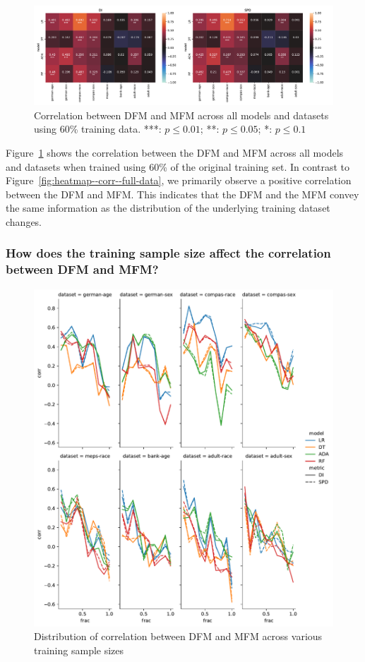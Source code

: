 \documentclass{article}
\begin{document}
\begin{figure}
  \centering
  \includegraphics[width=0.95\linewidth]{heatmap--corr--training-sets-frac.pdf}
  \caption{Correlation between DFM and MFM across all models and
  datasets using 60\% training data. ***: $p\le0.01$; **: $p\le0.05$;
  *: $p\le0.1$}
  \label{fig:heatmap--corr--training-sets-frac}
\end{figure}

Figure \ref{fig:heatmap--corr--training-sets-frac} shows the
correlation between the DFM and MFM across all models and datasets
when trained using 60\% of the original training set. In contrast to
Figure \ref{fig:heatmap--corr--full-data}, we primarily observe
a positive correlation between the DFM and MFM. This indicates that
the DFM and the MFM convey the same information as the distribution of
the underlying training dataset changes.

\subsubsection{How does the training sample size affect the correlation between DFM and MFM?}\label{sec:results-corr-frac}

\begin{figure}
  \centering
  \includegraphics[width=0.95\linewidth]{lineplot--frac--corr.pdf}
  \caption{Distribution of correlation between DFM and MFM across
    various training sample sizes}
  \label{fig:lineplot--frac--corr}
\end{figure}
\end{document}
